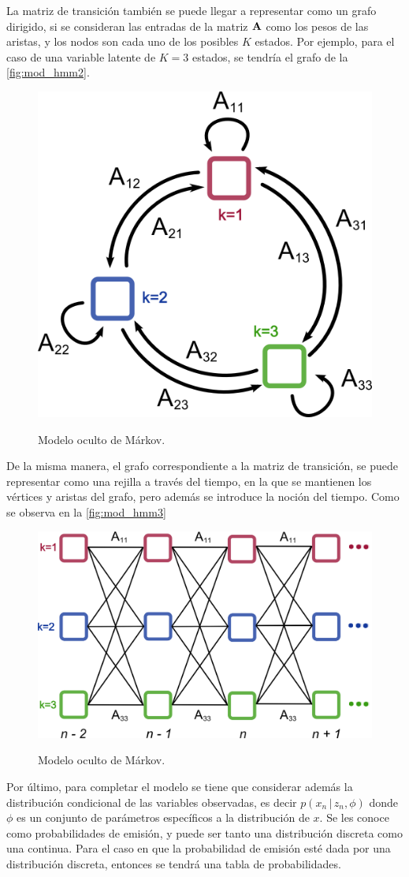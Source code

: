 La matriz de transición también se puede llegar a representar como un grafo dirigido, si se consideran las entradas de la matriz $\textbf{A}$ como los pesos de las aristas, y los nodos son cada uno de los posibles $K$ estados. Por ejemplo, para el caso de una variable latente de $K = 3$ estados, se tendría el grafo de la \autoref{fig:mod_hmm2}.

\begin{figure}[hbt]
        \myfloatalign
        {\includegraphics[width=0.4\linewidth]{gfx/chap2/mod-hmm2}}
        \caption{Modelo oculto de Márkov.}
        \label{fig:mod_hmm2}
\end{figure}

De la misma manera, el grafo correspondiente a la matriz de transición, se puede representar como una rejilla a través del tiempo, en la que se mantienen los vértices y aristas del grafo, pero además se introduce la noción del tiempo. Como se observa en la \autoref{fig:mod_hmm3} 

\begin{figure}[hbt]
        \myfloatalign
        {\includegraphics[width=0.63\linewidth]{gfx/chap2/mod-hmm3}}
        \caption{Modelo oculto de Márkov.}
        \label{fig:mod_hmm3}
\end{figure}

Por último, para completar el modelo se tiene que considerar además la distribución condicional de las variables observadas, es decir $p(x_n \,|\, z_n, \phi)$ donde $\phi$ es un conjunto de parámetros específicos a la distribución de $x$. Se les conoce como probabilidades de emisión, y puede ser tanto una distribución discreta como una continua. Para el caso en que la probabilidad de emisión esté dada por una distribución discreta, entonces se tendrá una tabla de probabilidades.

